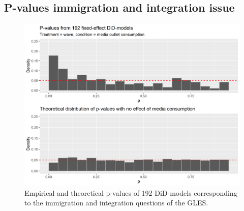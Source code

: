 \documentclass{article}
\begin{document}
\newpage

\subsection{P-values immigration and integration issue}\label{app:p-val_imm}

\begin{figure}[!ht]
    \centering
    \includegraphics[width=\textwidth]{paper/vis/DiD_model_ps_immint.png}
    \caption{Empirical and theoretical p-values of 192 DiD-models corresponding to the immigration and integration questions of the GLES.}
    \label{fig:p-val_imm}
\end{figure}
\end{document}
